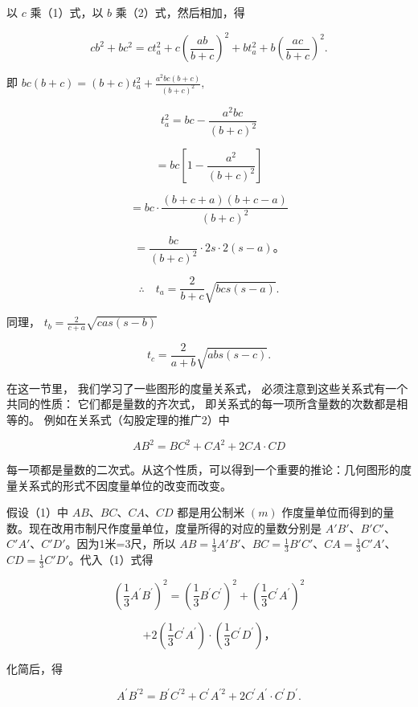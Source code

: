以 \(c\) 乘（1）式，以 \(b\) 乘（2）式，然后相加，得

\[
c b ^ {2} + b c ^ {2} = c t _ {a} ^ {2} + c \left(\frac {a b}{b + c}\right) ^ {2} + b t _ {a} ^ {2} + b \left(\frac {a c}{b + c}\right) ^ {2}.
\]

即 \(bc(b + c) = (b + c)t_a^2 +\frac{a^2bc(b + c)}{(b + c)^2},\)

\[
t _ {a} ^ {2} = b c - \frac {a ^ {2} b c}{(b + c) ^ {2}}
\]

\[
= b c \left[ 1 - \frac {a ^ {2}}{(b + c) ^ {2}} \right]
\]

\[
= b c \cdot \frac {(b + c + a) (b + c - a)}{(b + c) ^ {2}}
\]

\[
= \frac {b c}{(b + c) ^ {2}} \cdot 2 s \cdot 2 (s - a)\text{。}
\]

\[
\therefore \quad t _ {a} = \frac {2}{b + c} \sqrt {b c s (s - a)}.
\]

同理， \(t_b = \frac{2}{c + a}\sqrt{cas(s - b)}\)

\[
t_c = \frac {2}{a + b} \sqrt {a b s (s - c)}.
\]

在这一节里， 我们学习了一些图形的度量关系式，
必须注意到这些关系式有一个共同的性质： 它们都是量数的齐次式，
即关系式的每一项所含量数的次数都是相等的。
例如在关系式（勾股定理的推广2）中

\[
A B ^ {2} = B C ^ {2} + C A ^ {2} + 2 C A \cdot C D \tag {1}
\]

每一项都是量数的二次式。从这个性质，可以得到一个重要的推论：几何图形的度量关系式的形式不因度量单位的改变而改变。

假设（1）中 \(AB\)、\(BC\)、\(CA\)、\(CD\) 都是用公制米 \((m)\)
作度量单位而得到的量数。现在改用市制尺作度量单位，度量所得的对应的量数分别是
\(A'B'\)、\(B'C'\)、\(C'A'\)、\(C'D'\)。因为1米=3尺，所以
\(AB=\frac{1}{3}A'B'\)、\(BC=\frac{1}{3}B'C'\)、\(CA=\frac{1}{3}C'A'\)、\(CD=\frac{1}{3}C'D'\)。代入（1）式得

\[
\left(\frac {1}{3} A ^ {\prime} B ^ {\prime}\right) ^ {2} = \left(\frac {1}{3} B ^ {\prime} C ^ {\prime}\right) ^ {2} + \left(\frac {1}{3} C ^ {\prime} A ^ {\prime}\right) ^ {2}
\]

\[
+ 2 \left(\frac {1}{3} C ^ {\prime} A ^ {\prime}\right) \cdot \left(\frac {1}{3} C ^ {\prime} D ^ {\prime}\right)\text{，}
\]

化简后，得

\[
A ^ {\prime} B ^ {\prime 2} = B ^ {\prime} C ^ {\prime 2} + C ^ {\prime} A ^ {\prime 2} + 2 C ^ {\prime} A ^ {\prime} \cdot C ^ {\prime} D ^ {\prime}. \tag {2}
\]

